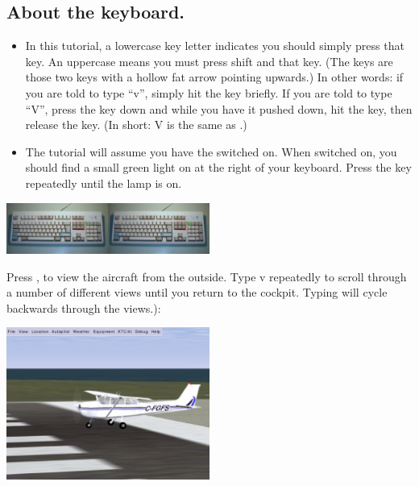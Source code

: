 \begin{itemize}
\subsection*{About the keyboard.}

\begin{itemize}
    \item In this tutorial, a lowercase key letter indicates you should simply
  press that key. An uppercase means you must press shift and that key.
  (The \textcolor{blue}{} keys are those two keys with
  a hollow fat arrow pointing upwards.) In other words: if you are told to type
  ``v'', simply hit the  key briefly.
   If you are told to type ``V'',
  press the  key down and while you have it pushed down, hit the
   key, then release the   key. (In short: V is the same as
  .)
    \item The tutorial will assume you have the  switched on.
   When switched on, you should find a small green
  light on at the right of your keyboard. Press the
  \textcolor{green}{} key repeatedly until the lamp is on.
\end{itemize}

\begin{center}
\includegraphics[width=0.5\textwidth]{img/tut_7}
\end{center}

Press , to view the aircraft from the outside. Type v repeatedly to
scroll through a number of different views until you return to the cockpit.
Typing  will cycle backwards through the views.):

\begin{center}
\includegraphics[width=0.5\textwidth]{img/tut_8}
\end{center}


\end{itemize}
